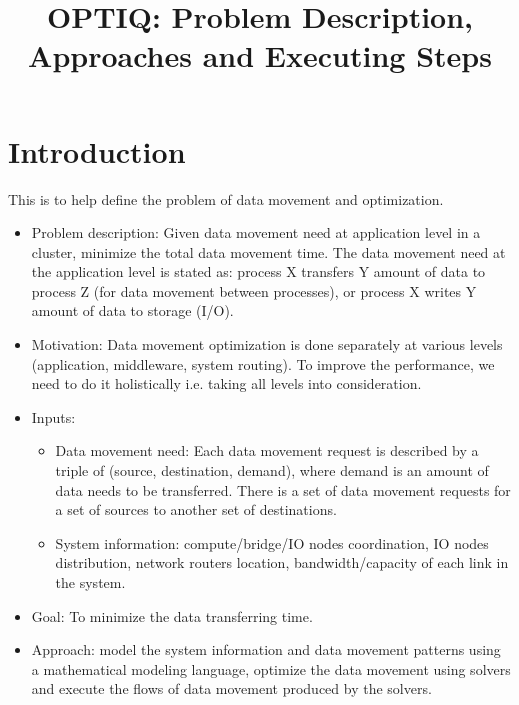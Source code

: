 \documentclass[letter]{article}
\title{OPTIQ: Problem Description, Approaches and Executing Steps}
\begin{document}
\maketitle



\section{Introduction}
This is to help define the problem of data movement and optimization.

\begin{itemize}
\item Problem description: Given data movement need at application level in a cluster, minimize the total data movement time. The data movement need at the application level is stated as: process X transfers Y amount of data to process Z (for data movement between processes), or process X writes Y amount of data to storage (I/O).
\item Motivation: Data movement optimization is done separately at various levels (application, middleware, system routing). To improve the performance, we need to do it holistically i.e. taking all levels into consideration.
\item Inputs: 
\begin{itemize}
\item Data movement need: Each data movement request is described by a triple of (source, destination, demand), where demand is an amount of data needs to be transferred. There is a set of data movement requests for a set of sources to another set of destinations.
\item System information: compute/bridge/IO nodes coordination, IO nodes distribution, network routers location, bandwidth/capacity of each link in the system. 
\end{itemize}
\item Goal: To minimize the data transferring time.
\item Approach: model the system information and data movement patterns using a mathematical modeling language, optimize the data movement using solvers and execute the flows of data movement produced by the solvers.
\end{itemize}
\end{document}

